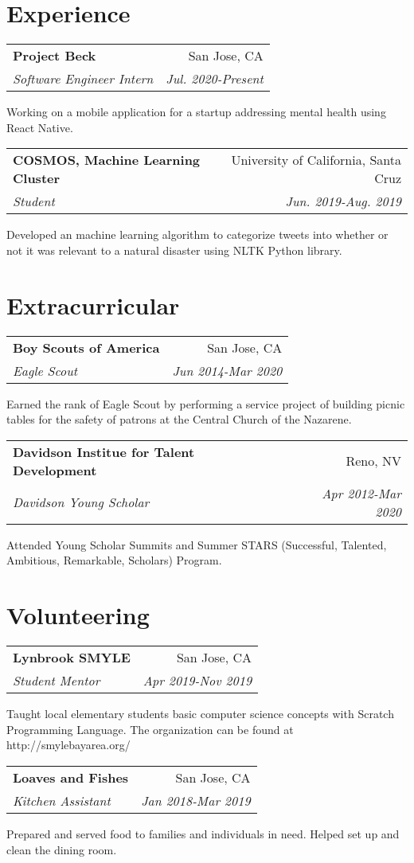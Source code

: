 \documentclass[letterpaper,11pt]{article}
\makeatletter
\newcommand{\resumeSubheading}[4]{
  \vspace{0.25em}
  \begin{tabular*}{0.97\textwidth}[t]{l@{\extracolsep{\fill}}r}
    \textbf{#1} & #2 \\
    \textit{\small#3} & \textit{\small #4} \\
  \end{tabular*}\vspace{0.25em}
}
\makeatother
\begin{document}
\section{Experience}

\resumeSubheading{Project Beck}{San Jose, CA}{Software Engineer Intern}{Jul. 2020-Present}

Working on a mobile application for a startup addressing mental health using React Native.

\resumeSubheading{COSMOS, Machine Learning Cluster}
{University of California, Santa Cruz}{Student}{Jun. 2019-Aug. 2019}

Developed an machine learning algorithm to categorize tweets into whether or not it was relevant to a natural disaster using NLTK Python library.

\section{Extracurricular}

\resumeSubheading{Boy Scouts of America}
{San Jose, CA}{Eagle Scout}{Jun 2014-Mar 2020}

Earned the rank of Eagle Scout by performing a service project of building picnic tables for the safety of patrons at the Central Church of the Nazarene.

\resumeSubheading{Davidson Institue for Talent Development}
{Reno, NV}{Davidson Young Scholar}{Apr 2012-Mar 2020}

Attended Young Scholar Summits and Summer STARS (Successful, Talented, Ambitious, Remarkable, Scholars) Program.

\section{Volunteering}

\resumeSubheading{Lynbrook SMYLE}
{San Jose, CA}{Student Mentor}{Apr 2019-Nov 2019}

Taught local elementary students basic computer science concepts with Scratch Programming Language. The organization can be found at http://smylebayarea.org/

\resumeSubheading{Loaves and Fishes}
{San Jose, CA}{Kitchen Assistant}{Jan 2018-Mar 2019}

Prepared and served food to families and individuals in need. Helped set up and clean the dining room.
\end{document}
